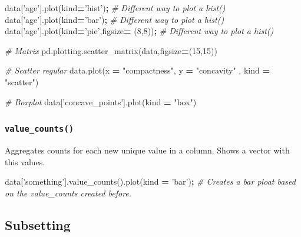 \documentclass[]{book}
\newenvironment{Shaded}{\begin{snugshade}}{\end{snugshade}}
\newcommand{\DecValTok}[1]{\textcolor[rgb]{0.00,0.00,0.81}{#1}}
\newcommand{\StringTok}[1]{\textcolor[rgb]{0.31,0.60,0.02}{#1}}
\newcommand{\CommentTok}[1]{\textcolor[rgb]{0.56,0.35,0.01}{\textit{#1}}}
\newcommand{\OperatorTok}[1]{\textcolor[rgb]{0.81,0.36,0.00}{\textbf{#1}}}
\newcommand{\NormalTok}[1]{#1}
\begin{document}
\begin{Shaded}
\begin{Highlighting}[]
\NormalTok{data[}\StringTok{'age'}\NormalTok{].plot(kind}\OperatorTok{=}\StringTok{'hist'}\NormalTok{)}\OperatorTok{;} \CommentTok{# Different way to plot a hist()}
\NormalTok{data[}\StringTok{'age'}\NormalTok{].plot(kind}\OperatorTok{=}\StringTok{'bar'}\NormalTok{)}\OperatorTok{;} \CommentTok{# Different way to plot a hist()}
\NormalTok{data[}\StringTok{'age'}\NormalTok{].plot(kind}\OperatorTok{=}\StringTok{'pie'}\NormalTok{,figsize}\OperatorTok{=}\NormalTok{ (}\DecValTok{8}\NormalTok{,}\DecValTok{8}\NormalTok{))}\OperatorTok{;} \CommentTok{# Different way to plot a hist()}

\CommentTok{# Matrix}
\NormalTok{pd.plotting.scatter_matrix(data,figsize}\OperatorTok{=}\NormalTok{(}\DecValTok{15}\NormalTok{,}\DecValTok{15}\NormalTok{))}

\CommentTok{# Scatter regular}
\NormalTok{data.plot(x }\OperatorTok{=} \StringTok{"compactness"}\NormalTok{, y }\OperatorTok{=} \StringTok{"concavity"}\NormalTok{ , kind }\OperatorTok{=} \StringTok{"scatter"}\NormalTok{)}

\CommentTok{# Boxplot}
\NormalTok{data[}\StringTok{'concave_points'}\NormalTok{].plot(kind }\OperatorTok{=} \StringTok{"box"}\NormalTok{)}
\end{Highlighting}
\end{Shaded}

\subsubsection{\texorpdfstring{\texttt{value\_counts()}}{value\_counts()}}\label{value_counts}

Aggregates counts for each new unique value in a column. Shows a vector
with this values.

\begin{Shaded}
\begin{Highlighting}[]
\NormalTok{data[}\StringTok{'something'}\NormalTok{].value_counts().plot(kind }\OperatorTok{=} \StringTok{'bar'}\NormalTok{)}\OperatorTok{;} \CommentTok{# Creates a bar ploat based on the value_counts created before.}
\end{Highlighting}
\end{Shaded}

\subsection{Subsetting}\label{subsetting}
\end{document}
